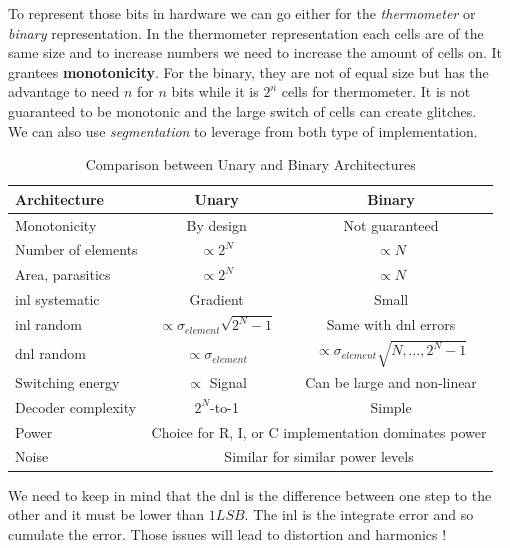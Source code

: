 \documentclass{report}
\begin{document}
To represent those bits in hardware we can go either for the \textit{thermometer} or \textit{binary} representation. In the thermometer representation each cells are of the same size and to increase numbers we need to increase the amount of cells on. It grantees \textbf{monotonicity}. For the binary, they are not of equal size but has the advantage to need $n$ for $n$ bits while it is $2^n$ cells for thermometer. It is not guaranteed to be monotonic and the large switch of cells can create glitches.\\

We can also use \textit{segmentation} to leverage from both type of implementation.

\begin{table}[H]
    \centering
    \renewcommand{\arraystretch}{1.3} %
    \begin{tabular}{|l|c|c|}
        \hline
        \textbf{Architecture} & \textbf{Unary} & \textbf{Binary} \\
        \hline
        Monotonicity & By design & Not guaranteed \\
        \hline
        Number of elements & $\propto 2^N$ & $\propto N$ \\
        \hline
        Area, parasitics & $\propto 2^N$ & $\propto N$ \\
        \hline
        \gls{inl} systematic & Gradient & Small \\
        \hline
        \gls{inl} random & $\propto \sigma_{element} \sqrt{2^N-1}$ & Same with \gls{dnl} errors \\
        \hline
        \gls{dnl} random & $\propto \sigma_{element}$ & $\propto \sigma_{element} \sqrt{N, \dots, 2^N-1}$ \\
        \hline
        Switching energy & $\propto$ Signal & Can be large and non-linear \\
        \hline
        Decoder complexity & $2^N$-to-1 & Simple \\
        \hline
        Power & \multicolumn{2}{c|}{Choice for R, I, or C implementation dominates power} \\
        \hline
        Noise & \multicolumn{2}{c|}{Similar for similar power levels} \\
        \hline
    \end{tabular}
    \caption{Comparison between Unary and Binary Architectures}
    \label{tab:unary_vs_binary}
\end{table}

We need to keep in mind that the \gls{dnl} is the difference between one step to the other and it must be lower than $1 LSB$. The \gls{inl} is the integrate error and so cumulate the error. Those issues will lead to distortion and harmonics !
\end{document}
